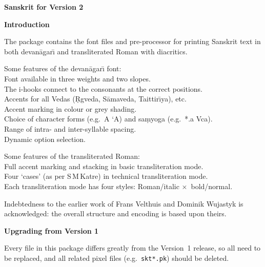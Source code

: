 \documentclass[12pt]{article}
\begin{document}
{\Large \textbf{Sanskrit for \LaTeXe \hfill Version 2}\par}%
\vfill
\vspace{1mm}

{\large \textbf{Introduction}\par}

The package contains the font files and pre-processor for printing
Sanskrit text in both {\skti devan\=agar\={\i}} and transliterated Roman
with diacritics.

Some features of the {\skti devan\=agar\={\i}} font:\\[2mm]
\makebox[8mm][c]{$\bullet$}
      Font available in three weights 
      and two slopes.\\ 
\makebox[8mm][c]{$\bullet$}
      The i-hooks connect to the consonants at the correct positions.\\
\makebox[8mm][c]{$\bullet$}
      Accents for all {\skti Veda\/}s ({\skti \d Rgveda}, {\skti S\=amaveda}, 
      {\skti Taittir\={\i}ya}), etc.\\
\makebox[8mm][c]{$\bullet$}
      Accent marking in colour or grey shading.\\
\makebox[8mm][c]{$\bullet$}
      Choice of character forms (e.g.~{\skt A\,\ZN{/}\,`A}) and
      {\skti sa\d myoga} (e.g.~{\skt {}*.a\,\ZN{/}\,Vca}).\\
\makebox[8mm][c]{$\bullet$}
      Range of intra- and inter-syllable spacing.\\
\makebox[8mm][c]{$\bullet$}
      Dynamic option selection.

Some features of the transliterated Roman:\\[2mm]
\makebox[8mm][c]{$\bullet$}
      Full accent marking and stacking in basic transliteration mode.\\
\makebox[8mm][c]{$\bullet$}
      Four `cases' (as per S\,M\,Katre) in technical transliteration mode.\\
\makebox[8mm][c]{$\bullet$}
      Each transliteration mode has four styles: Roman/italic $\times$\ 
      bold/normal. 

Indebtedness to the earlier work of Frans Velthuis and Dominik Wujastyk is
acknowledged: the overall structure and encoding is based upon theirs.
\vspace{3.5mm}

{\large \textbf{Upgrading from Version 1}\par}

Every file in this package differs greatly from the Version~1 release,
so all need to be replaced, and all related pixel files (e.g.~\verb+skt*.pk+)
should be deleted.
\end{document}
